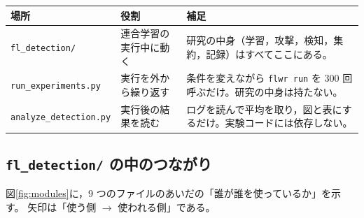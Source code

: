 \documentclass[a4j, dvipdfmx]{jsarticle}  %
\begin{document}
\begin{table}[H]
\centering
\begin{tabular}{@{}P{4.4cm} P{4.2cm} P{6.7cm}@{}}
\toprule
場所 & 役割 & 補足 \\
\midrule
\texttt{fl\_detection/} & 連合学習の実行中に動く & 研究の中身（学習，攻撃，検知，集約，記録）はすべてここにある。 \\
\texttt{run\_experiments.py} & 実行を外から繰り返す & 条件を変えながら \texttt{flwr run} を 300 回呼ぶだけ。研究の中身は持たない。 \\
\texttt{analyze\_detection.py} & 実行後の結果を読む & ログを読んで平均を取り，図と表にするだけ。実験コードには依存しない。 \\
\bottomrule
\end{tabular}
\end{table}

\subsection{\texttt{fl\_detection/} の中のつながり}

図\ref{fig:modules}に，9 つのファイルのあいだの「誰が誰を使っているか」を示す。
矢印は「使う側 $\rightarrow$ 使われる側」である。
\end{document}
